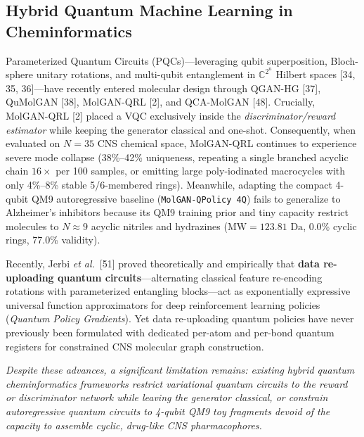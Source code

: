 \documentclass[10pt,a4paper]{article}
\begin{document}
\subsection{Hybrid Quantum Machine Learning in Cheminformatics}
Parameterized Quantum Circuits (PQCs)---leveraging qubit superposition, Bloch-sphere unitary rotations, and multi-qubit entanglement in $\mathbb{C}^{2^n}$ Hilbert spaces [34, 35, 36]---have recently entered molecular design through QGAN-HG [37], QuMolGAN [38], MolGAN-QRL [2], and QCA-MolGAN [48]. Crucially, MolGAN-QRL [2] placed a VQC exclusively inside the \textit{discriminator/reward estimator} while keeping the generator classical and one-shot. Consequently, when evaluated on $N=35$ CNS chemical space, MolGAN-QRL continues to experience severe mode collapse (38\%--42\% uniqueness, repeating a single branched acyclic chain $16\times$ per 100 samples, or emitting large poly-iodinated macrocycles with only 4\%--8\% stable 5/6-membered rings). Meanwhile, adapting the compact 4-qubit QM9 autoregressive baseline (\texttt{MolGAN-QPolicy 4Q}) fails to generalize to Alzheimer's inhibitors because its QM9 training prior and tiny capacity restrict molecules to $N \approx 9$ acyclic nitriles and hydrazines ($\text{MW} = 123.81\text{ Da}$, 0.0\% cyclic rings, 77.0\% validity).

Recently, Jerbi \textit{et al.}~[51] proved theoretically and empirically that \textbf{data re-uploading quantum circuits}---alternating classical feature re-encoding rotations with parameterized entangling blocks---act as exponentially expressive universal function approximators for deep reinforcement learning policies (\textit{Quantum Policy Gradients}). Yet data re-uploading quantum policies have never previously been formulated with dedicated per-atom and per-bond quantum registers for constrained CNS molecular graph construction.
\par\vspace{0.08cm}
\noindent\textit{Despite these advances, a significant limitation remains: existing hybrid quantum cheminformatics frameworks restrict variational quantum circuits to the reward or discriminator network while leaving the generator classical, or constrain autoregressive quantum circuits to 4-qubit QM9 toy fragments devoid of the capacity to assemble cyclic, drug-like CNS pharmacophores.}
\end{document}
